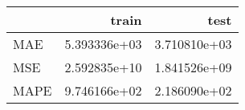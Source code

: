 \begin{tabular}{lrr}
\toprule
{} &         train &          test \\
\midrule
MAE  &  5.393336e+03 &  3.710810e+03 \\
MSE  &  2.592835e+10 &  1.841526e+09 \\
MAPE &  9.746166e+02 &  2.186090e+02 \\
\bottomrule
\end{tabular}
